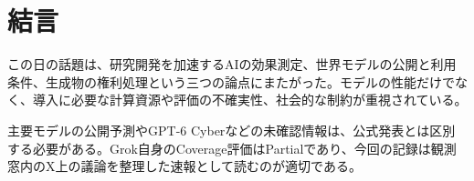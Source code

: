 \section{結言}
この日の話題は、研究開発を加速するAIの効果測定、世界モデルの公開と利用条件、生成物の権利処理という三つの論点にまたがった。モデルの性能だけでなく、導入に必要な計算資源や評価の不確実性、社会的な制約が重視されている。

主要モデルの公開予測やGPT-6 Cyberなどの未確認情報は、公式発表とは区別する必要がある。Grok自身のCoverage評価はPartialであり、今回の記録は観測窓内のX上の議論を整理した速報として読むのが適切である。

